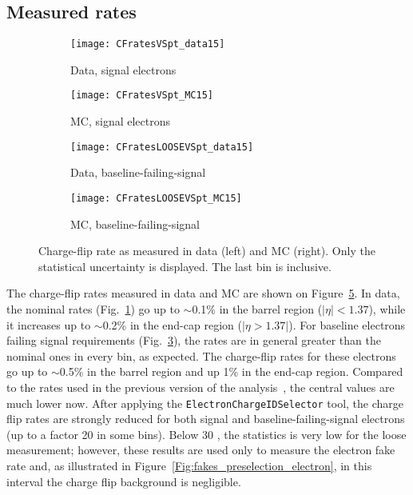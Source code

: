 \subsection*{Measured rates}
\label{subsec:chargeflip_rates}

\begin{figure}[t!]
\centering
\begin{subfigure}[b]{0.45\textwidth}
	\texttt{[image: CFratesVSpt\_data15]}
	\caption{Data, signal electrons}\label{fig:Chflip_nominalData}
\end{subfigure}
\begin{subfigure}[b]{0.45\textwidth}
	\texttt{[image: CFratesVSpt\_MC15]}
	\caption{MC, signal electrons}\label{fig:Chflip_nominalMC}
\end{subfigure}
\begin{subfigure}[b]{0.45\textwidth}
	\texttt{[image: CFratesLOOSEVSpt\_data15]}
	\caption{Data, baseline-failing-signal}\label{fig:Chflip_looseData}
\end{subfigure}
\begin{subfigure}[b]{0.45\textwidth}
	\texttt{[image: CFratesLOOSEVSpt\_MC15]}
	\caption{MC, baseline-failing-signal}\label{fig:Chflip_looseMC}
\end{subfigure}
\caption{Charge-flip rate as measured in data (left) and MC (right). 
Only the statistical uncertainty is displayed. The last \pt bin is inclusive.}
\label{fig:ChFlip_Rate}
\end{figure}

The charge-flip rates measured in data and MC are shown on Figure~\ref{fig:ChFlip_Rate}. 
 In data, the nominal rates (Fig.~\ref{fig:Chflip_nominalData}) go up to $\sim$0.1\% in the barrel region ($|\eta| < 1.37$), 
 while it increases up to $\sim$0.2\% in the end-cap region ($|\eta > 1.37|$). 
 For baseline electrons failing signal requirements (Fig.~\ref{fig:Chflip_looseData}), 
 the rates are in general greater than the nominal ones in every bin, as expected. The charge-flip rates for these electrons go up to $\sim$0.5\% in the barrel region and up 1\% in the end-cap region. Compared to the rates used in the previous version of the analysis~\cite{ATLAS-CONF-2016-037}, the central values are much lower now. After applying the \texttt{ElectronChargeIDSelector} tool, the charge flip rates are strongly reduced for both signal and baseline-failing-signal electrons (up to a factor 20 in some bins). Below 30 \GeV, the statistics is very low for the loose measurement; however, these results are used only to measure the electron fake rate and, as illustrated in Figure~\ref{Fig:fakes_preselection_electron}, in this \pt interval the charge flip background is negligible.

